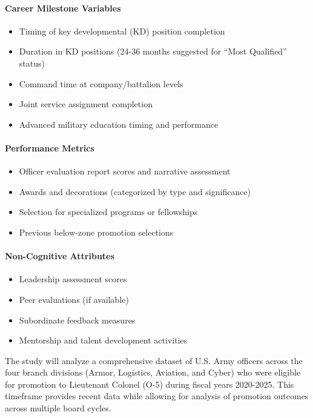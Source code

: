 \documentclass[../main.tex]{subfiles}
\begin{document}
\paragraph{Career Milestone Variables}
\begin{itemize}
\item Timing of key developmental (KD) position completion
\item Duration in KD positions (24-36 months suggested for ``Most Qualified'' status) \citep{army_cmf12}
\item Command time at company/battalion levels
\item Joint service assignment completion
\item Advanced military education timing and performance
\end{itemize}

\paragraph{Performance Metrics}
\begin{itemize}
\item Officer evaluation report scores and narrative assessment
\item Awards and decorations (categorized by type and significance)
\item Selection for specialized programs or fellowships
\item Previous below-zone promotion selections
\end{itemize}

\paragraph{Non-Cognitive Attributes}
\begin{itemize}
\item Leadership assessment scores
\item Peer evaluations (if available)
\item Subordinate feedback measures
\item Mentorship and talent development activities
\end{itemize}


The study will analyze a comprehensive dataset of U.S. Army officers across the four branch divisions (Armor, Logistics, Aviation, and Cyber) who were eligible for promotion to Lieutenant Colonel (O-5) during fiscal years 2020-2025. This timeframe provides recent data while allowing for analysis of promotion outcomes across multiple board cycles.
\end{document}
